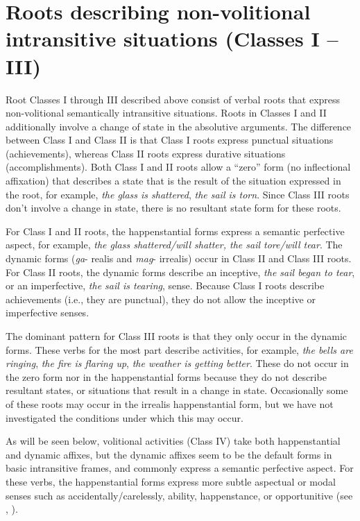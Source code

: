 \section{Roots describing non-volitional intransitive situations (Classes I – III)}
\label{bkm:Ref148856716}
Root Classes I through III described above consist of verbal roots that express non-volitional semantically intransitive situations. Roots in Classes I and II additionally involve a change of state in the absolutive arguments. The difference between Class I and Class II is that Class I roots express punctual situations (achievements), whereas Class II roots express durative situations (accomplishments). Both Class I and II roots allow a “zero” form (no inflectional affixation) that describes a state that is the result of the situation expressed in the root, for example, \textit{the glass is shattered}, \textit{the sail is torn}. Since Class III roots don’t involve a change in state, there is no resultant state form for these roots.

For Class I and II roots, the happenstantial forms express a semantic perfective aspect, for example, \textit{the glass shattered/will shatter, the sail tore/will tear}. The dynamic forms (\textit{ga}{}- realis and \textit{mag}{}- irrealis) occur in Class II and Class III roots. For Class II roots, the dynamic forms describe an inceptive, \textit{the sail began to tear}, or an imperfective, \textit{the sail is tearing}, sense. Because Class I roots describe achievements (i.e., they are punctual), they do not allow the inceptive or imperfective senses. 

The dominant pattern for Class III roots is that they only occur in the dynamic forms. These verbs for the most part describe activities, for example, \textit{the bells are ringing}, \textit{the fire is flaring up}, \textit{the weather is getting better}. These do not occur in the zero form nor in the happenstantial forms because they do not describe resultant states, or situations that result in a change in state. Occasionally some of these roots may occur in the irrealis happenstantial form, but we have not investigated the conditions under which this may occur.

As will be seen below, volitional activities (Class IV) take both happenstantial and dynamic affixes, but the dynamic affixes seem to be the default forms in basic intransitive frames, and commonly express a semantic perfective aspect. For these verbs, the happenstantial forms express more subtle aspectual or modal senses such as accidentally/carelessly, ability, happenstance, or opportunitive (see , ). 

